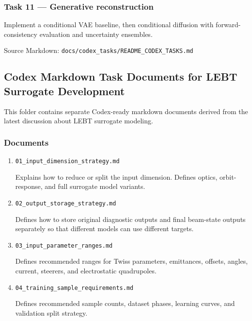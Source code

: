 \documentclass[
]{article}
\begin{document}
\hypertarget{task-11-generative-reconstruction}{%
\subsubsection{Task 11 --- Generative
reconstruction}\label{task-11-generative-reconstruction}}

Implement a conditional VAE baseline, then conditional diffusion with
forward-consistency evaluation and uncertainty ensembles.

Source Markdown: \texttt{docs/codex\_tasks/README\_CODEX\_TASKS.md}

\hypertarget{codex-markdown-task-documents-for-lebt-surrogate-development}{%
\subsection{Codex Markdown Task Documents for LEBT Surrogate
Development}\label{codex-markdown-task-documents-for-lebt-surrogate-development}}

This folder contains separate Codex-ready markdown documents derived
from the latest discussion about LEBT surrogate modeling.

\hypertarget{documents}{%
\subsubsection{Documents}\label{documents}}

\begin{enumerate}
\def\labelenumi{\arabic{enumi}.}
\item
  \texttt{01\_input\_dimension\_strategy.md}

  Explains how to reduce or split the input dimension. Defines optics,
  orbit-response, and full surrogate model variants.
\item
  \texttt{02\_output\_storage\_strategy.md}

  Defines how to store original diagnostic outputs and final beam-state
  outputs separately so that different models can use different targets.
\item
  \texttt{03\_input\_parameter\_ranges.md}

  Defines recommended ranges for Twiss parameters, emittances, offsets,
  angles, current, steerers, and electrostatic quadrupoles.
\item
  \texttt{04\_training\_sample\_requirements.md}

  Defines recommended sample counts, dataset phases, learning curves,
  and validation split strategy.
\end{enumerate}
\end{document}
